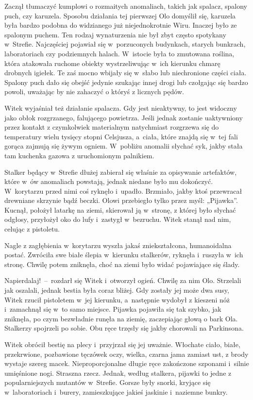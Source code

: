 \documentclass[../MAIN.tex]{subfiles}
\begin{document}
\qm
Zaczął tłumaczyć kumplowi o rozmaitych anomaliach, takich jak spalacz, spalony puch, czy karuzela. Sposobu działania tej pierwszej Olo domyślił się, karuzela była bardzo podobna do widzianego już niejednokrotnie Wiru. Inaczej było ze spalonym puchem. Ten rodzaj wynaturzenia nie był zbyt często spotykany w~Strefie. Najczęściej pojawiał się w~porzuconych budynkach, starych bunkrach, laboratoriach czy podziemnych halach. W~istocie była to zmutowana roślina, która atakowała ruchome obiekty wystrzeliwując w~ich kierunku chmarę drobnych igiełek. Te zaś mocno wbijały się w~słabo lub niechronione części ciała. Spalony puch dało się obejść jedynie szukając innej drogi lub czołgając się bardzo powoli, uważając by nie zahaczyć o któryś z licznych pędów.

Witek wyjaśniał też działanie spalacza. Gdy jest nieaktywny, to jest widoczny jako obłok rozgrzanego, falującego powietrza. Jeśli jednak zostanie uaktywniony przez kontakt z czymkolwiek materialnym natychmiast rozgrzewa się do temperatury wielu tysięcy stopni Celsjusza, a~ciała, które znajdą się w~tej fali gorąca zajmują się żywym ogniem. W~pobliżu anomalii słychać syk, jakby stała tam kuchenka gazowa z uruchomionym palnikiem.

Stalker będący w~Strefie dłużej zabierał się właśnie za opisywanie artefaktów, które w~ów anomaliach powstają, jednak niedane było mu dokończyć. W~korytarzu przed nimi coś ryknęło i~upadło. Brzmiało, jakby ktoś przewracał drewniane skrzynie bądź beczki. Olowi przebiegło tylko przez myśl: „Pijawka”. Kucnął, położył latarkę na ziemi, skierował ją w~stronę, z której było słychać odgłosy, przyłożył oko do lufy i~zastygł w~bezruchu. Witek stanął nad nim, celując z pistoletu.

Nagle z zagłębienia w~korytarzu wyszła jakaś zniekształcona, humanoidalna postać. Zwróciła swe białe ślepia w~kierunku stalkerów, ryknęła i~ruszyła w~ich stronę. Chwilę potem zniknęła, choć na ziemi było widać pojawiające się ślady.

\sd
\xx Napierdalaj!~--~rozdarł się Witek i~otworzył ogień. Chwilę za nim Olo.
\qm
 Strzelali jak oszalali, jednak bestia była coraz bliżej. Gdy zostały jej może dwa susy, Witek rzucił pistoletem w~jej kierunku, a~następnie wydobył z kieszeni nóż i~zamachnął się w~to samo miejsce. Pijawka pojawiła się tak szybko, jak zniknęła, po czym bezwładnie runęła na ziemię, zaczepiając głową o bark Ola. Stalkerzy spojrzeli po sobie. Obu ręce trzęsły się jakby chorowali na Parkinsona.

Witek obrócił bestię na plecy i~przyjrzał się jej uważnie. Włochate ciało, białe, przekrwione, pozbawione tęczówek oczy, wielka, czarna jama zamiast ust, z brody wystaje szereg macek. Nieproporcjonalne długie ręce zakończone szponami i~silnie umięśnione nogi. Straszna rzecz. Jednak, według stalkera, pijawki to jedne z popularniejszych mutantów w~Strefie. Gorsze były snorki, kryjące się w~laboratoriach i~burery, zamieszkujące jakieś jaskinie i~naziemne bunkry.
\end{document}
